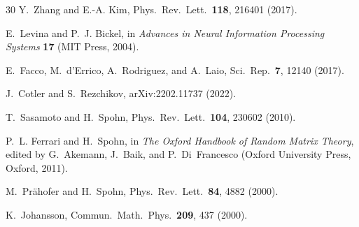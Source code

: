 \documentclass[aps,pre,twocolumn,superscriptaddress,showpacs,longbibliography]{revtex4-2}
\begin{document}
\begin{thebibliography}{30}
Y.~Zhang and E.-A. Kim, Phys.\ Rev.\ Lett.\ \textbf{118}, 216401 (2017).

E.~Levina and P.~J. Bickel, in \emph{Advances in Neural Information Processing Systems} \textbf{17} (MIT Press, 2004).

E.~Facco, M.~d'Errico, A.~Rodriguez, and A.~Laio, Sci.\ Rep.\ \textbf{7}, 12140 (2017).

J.~Cotler and S.~Rezchikov, arXiv:2202.11737 (2022).

T.~Sasamoto and H.~Spohn, Phys.\ Rev.\ Lett.\ \textbf{104}, 230602 (2010).

P.~L. Ferrari and H.~Spohn, in \emph{The Oxford Handbook of Random Matrix Theory}, edited by G.~Akemann, J.~Baik, and P.~Di~Francesco (Oxford University Press, Oxford, 2011).

M.~Pr\"ahofer and H.~Spohn, Phys.\ Rev.\ Lett.\ \textbf{84}, 4882 (2000).

K.~Johansson, Commun.\ Math.\ Phys.\ \textbf{209}, 437 (2000).

\end{thebibliography}
\end{document}
